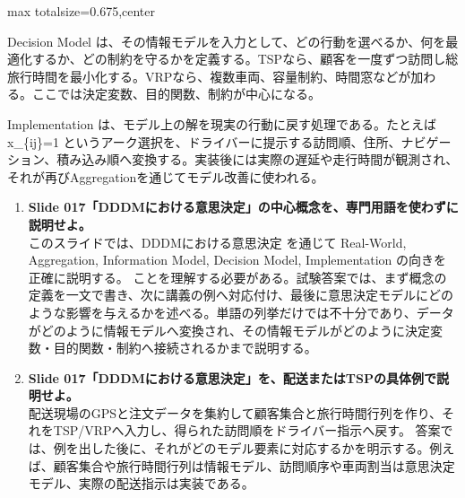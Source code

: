 \begin{adjustbox}{max totalsize={\textwidth}{0.675\textheight},center}
\begin{minipage}{\textwidth}
\begin{minipage}[t]{0.485\textwidth}
Decision Model は、その情報モデルを入力として、どの行動を選べるか、何を最適化するか、どの制約を守るかを定義する。TSPなら、顧客を一度ずつ訪問し総旅行時間を最小化する。VRPなら、複数車両、容量制約、時間窓などが加わる。ここでは決定変数、目的関数、制約が中心になる。\par
Implementation は、モデル上の解を現実の行動に戻す処理である。たとえば x\_\{ij\}=1 というアーク選択を、ドライバーに提示する訪問順、住所、ナビゲーション、積み込み順へ変換する。実装後には実際の遅延や走行時間が観測され、それが再びAggregationを通じてモデル改善に使われる。\par
{}
\begin{enumerate}
\item \textbf{Slide 017「DDDMにおける意思決定」の中心概念を、専門用語を使わずに説明せよ。}\\このスライドでは、DDDMにおける意思決定 を通じて Real-World, Aggregation, Information Model, Decision Model, Implementation の向きを正確に説明する。 ことを理解する必要がある。試験答案では、まず概念の定義を一文で書き、次に講義の例へ対応付け、最後に意思決定モデルにどのような影響を与えるかを述べる。単語の列挙だけでは不十分であり、データがどのように情報モデルへ変換され、その情報モデルがどのように決定変数・目的関数・制約へ接続されるかまで説明する。
\item \textbf{Slide 017「DDDMにおける意思決定」を、配送またはTSPの具体例で説明せよ。}\\配送現場のGPSと注文データを集約して顧客集合と旅行時間行列を作り、それをTSP/VRPへ入力し、得られた訪問順をドライバー指示へ戻す。 答案では、例を出した後に、それがどのモデル要素に対応するかを明示する。例えば、顧客集合や旅行時間行列は情報モデル、訪問順序や車両割当は意思決定モデル、実際の配送指示は実装である。
\end{enumerate}
\end{minipage}
\end{minipage}
\end{adjustbox}

